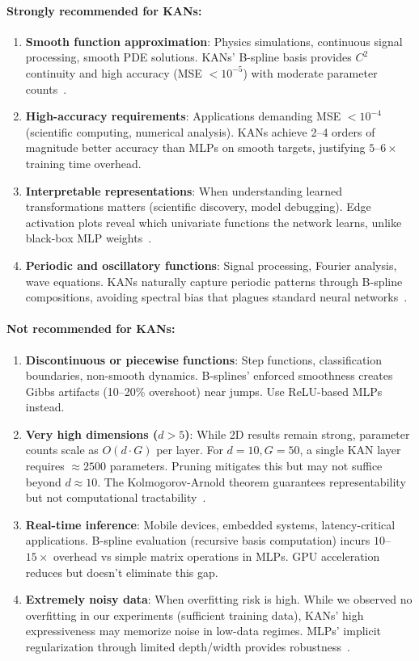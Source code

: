 \documentclass[11pt,a4paper]{article}
\begin{document}
\paragraph{Strongly recommended for KANs:}
\begin{enumerate}
    \item \textbf{Smooth function approximation}: Physics simulations, continuous signal processing, smooth PDE solutions. KANs' B-spline basis provides $C^2$ continuity and high accuracy (MSE $<10^{-5}$) with moderate parameter counts~\citep{liu2024kan}.
    \item \textbf{High-accuracy requirements}: Applications demanding MSE $<10^{-4}$ (scientific computing, numerical analysis). KANs achieve 2--4 orders of magnitude better accuracy than MLPs on smooth targets, justifying $5$--$6\times$ training time overhead.
    \item \textbf{Interpretable representations}: When understanding learned transformations matters (scientific discovery, model debugging). Edge activation plots reveal which univariate functions the network learns, unlike black-box MLP weights~\citep{liu2024kan}.
    \item \textbf{Periodic and oscillatory functions}: Signal processing, Fourier analysis, wave equations. KANs naturally capture periodic patterns through B-spline compositions, avoiding spectral bias that plagues standard neural networks~\citep{krishnapriyan2021characterizing}.
\end{enumerate}

\paragraph{Not recommended for KANs:}
\begin{enumerate}
    \item \textbf{Discontinuous or piecewise functions}: Step functions, classification boundaries, non-smooth dynamics. B-splines' enforced smoothness creates Gibbs artifacts (10--20\% overshoot) near jumps. Use ReLU-based MLPs instead.
    \item \textbf{Very high dimensions ($d > 5$)}: While 2D results remain strong, parameter counts scale as $O(d \cdot G)$ per layer. For $d=10, G=50$, a single KAN layer requires $\approx 2500$ parameters. Pruning mitigates this but may not suffice beyond $d \approx 10$. The Kolmogorov-Arnold theorem guarantees representability but not computational tractability~\citep{liu2024kan}.
    \item \textbf{Real-time inference}: Mobile devices, embedded systems, latency-critical applications. B-spline evaluation (recursive basis computation) incurs $10$--$15\times$ overhead vs simple matrix operations in MLPs. GPU acceleration reduces but doesn't eliminate this gap.
    \item \textbf{Extremely noisy data}: When overfitting risk is high. While we observed no overfitting in our experiments (sufficient training data), KANs' high expressiveness may memorize noise in low-data regimes. MLPs' implicit regularization through limited depth/width provides robustness~\citep{kingma2015adam}.
\end{enumerate}
\end{document}
